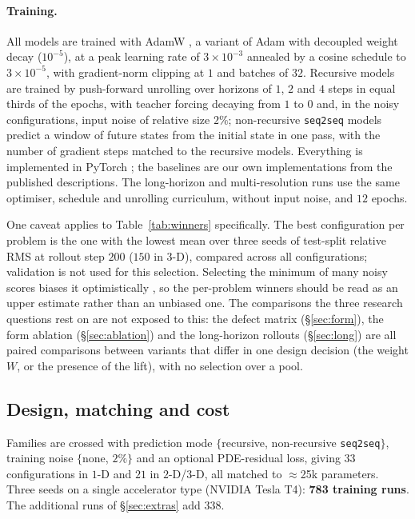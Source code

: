 \documentclass[11pt]{article}
\theoremstyle{definition}
\theoremstyle{remark}
\begin{document}
\paragraph{Training.} All models are trained with AdamW
\citep{loshchilov2019adamw}, a variant of Adam \citep{kingma2015adam} with
decoupled weight decay ($10^{-5}$), at a peak learning rate of $3\times10^{-3}$
annealed by a cosine schedule \citep{loshchilov2017sgdr} to $3\times10^{-5}$, with
gradient-norm clipping at $1$ and batches of $32$. Recursive models are trained
by push-forward unrolling over horizons of $1$, $2$ and $4$ steps in equal thirds
of the epochs, with teacher forcing decaying from $1$ to $0$ and, in the noisy
configurations, input noise of relative size $2\%$; non-recursive \texttt{seq2seq}
models predict a window of future states from the initial state in one pass, with
the number of gradient steps matched to the recursive models. Everything is implemented
in PyTorch \citep{paszke2019pytorch}; the baselines are our own implementations
from the published descriptions. The long-horizon and multi-resolution runs use the
same optimiser, schedule and unrolling curriculum, without input noise, and $12$
epochs.

One caveat applies to Table~\ref{tab:winners} specifically. The best
configuration per problem is the one with the lowest mean over three seeds of
test-split relative RMS at rollout step $200$ ($150$ in $3$-D), compared across
all configurations; validation is not used for this selection. Selecting the
minimum of many noisy scores biases it optimistically
\citep{cawley2010overfitting}, so the per-problem
winners should be read as an upper estimate rather than an unbiased one. The
comparisons the three research questions rest on are not exposed to this: the
defect matrix (\S\ref{sec:form}), the form ablation (\S\ref{sec:ablation}) and
the long-horizon rollouts (\S\ref{sec:long}) are all paired
comparisons between variants that differ in one design decision (the weight $W$,
or the presence of the lift), with no selection over a pool.

\subsection{Design, matching and cost}
\label{sec:design}

Families are crossed with prediction mode
$\{$recursive, non-recursive \texttt{seq2seq}$\}$, training noise
$\{$none, $2\%\}$ and an optional PDE-residual loss, giving $33$ configurations
in $1$-D and $21$ in $2$-D/$3$-D, all matched to $\approx$25k parameters. Three
seeds on a single accelerator type (NVIDIA Tesla T4): \textbf{783 training runs}.
The additional runs of \S\ref{sec:extras} add $338$.
\end{document}
